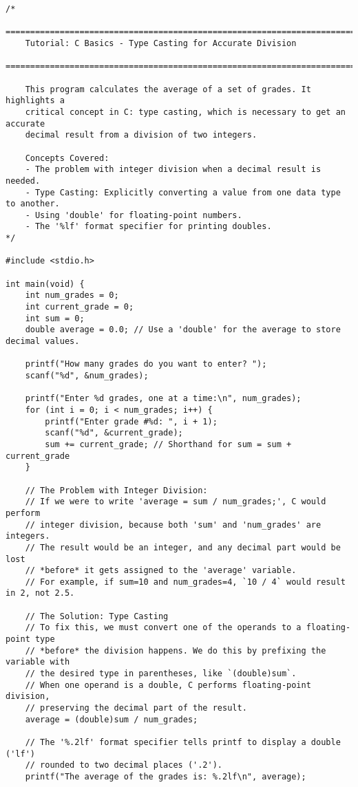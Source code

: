 \documentclass[11pt]{book}
\begin{document}
\begin{verbatim}
/*
    ================================================================================
    Tutorial: C Basics - Type Casting for Accurate Division
    ================================================================================

    This program calculates the average of a set of grades. It highlights a
    critical concept in C: type casting, which is necessary to get an accurate
    decimal result from a division of two integers.

    Concepts Covered:
    - The problem with integer division when a decimal result is needed.
    - Type Casting: Explicitly converting a value from one data type to another.
    - Using 'double' for floating-point numbers.
    - The '%lf' format specifier for printing doubles.
*/

#include <stdio.h>

int main(void) {
    int num_grades = 0;
    int current_grade = 0;
    int sum = 0;
    double average = 0.0; // Use a 'double' for the average to store decimal values.

    printf("How many grades do you want to enter? ");
    scanf("%d", &num_grades);

    printf("Enter %d grades, one at a time:\n", num_grades);
    for (int i = 0; i < num_grades; i++) {
        printf("Enter grade #%d: ", i + 1);
        scanf("%d", &current_grade);
        sum += current_grade; // Shorthand for sum = sum + current_grade
    }

    // The Problem with Integer Division:
    // If we were to write 'average = sum / num_grades;', C would perform
    // integer division, because both 'sum' and 'num_grades' are integers.
    // The result would be an integer, and any decimal part would be lost
    // *before* it gets assigned to the 'average' variable.
    // For example, if sum=10 and num_grades=4, `10 / 4` would result in 2, not 2.5.

    // The Solution: Type Casting
    // To fix this, we must convert one of the operands to a floating-point type
    // *before* the division happens. We do this by prefixing the variable with
    // the desired type in parentheses, like `(double)sum`.
    // When one operand is a double, C performs floating-point division,
    // preserving the decimal part of the result.
    average = (double)sum / num_grades;

    // The '%.2lf' format specifier tells printf to display a double ('lf')
    // rounded to two decimal places ('.2').
    printf("The average of the grades is: %.2lf\n", average);


\end{verbatim}
\end{document}
